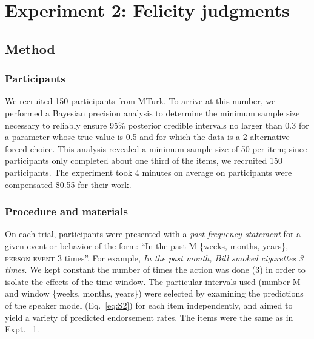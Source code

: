 \documentclass[10pt,letterpaper]{article}
\newcommand{\ndg}[1]{\textcolor{Green}{[ndg: #1]}}
\newcommand{\mht}[1]{\textcolor{DarkOrange}{[mht: #1]}}
\begin{document}



\section{Experiment 2: Felicity judgments}

\subsection{Method}

\subsubsection{Participants}

We recruited 150 participants from MTurk.
To arrive at this number, we performed a Bayesian precision analysis to determine the minimum sample size necessary to reliably ensure 95\% posterior credible intervals no larger than 0.3 for a parameter whose true value is 0.5 and for which the data is a 2 alternative forced choice. This analysis revealed a minimum sample size of 50 per item; since participants only completed about one third of the items, we recruited 150 participants.
The experiment took 4 minutes on average on participants were compensated \$0.55 for their work.

\subsubsection{Procedure and materials}

On each trial, participants were presented with a \emph{past frequency statement} for a given event or behavior of the form: ``In the past M \{weeks, months, years\}, \textsc{person} \textsc{event} 3 times''.
For example, \emph{In the past month, Bill smoked cigarettes 3 times}.
We kept constant the number of times the action was done (3) in order to isolate the effects of the time window. 
The particular intervals used (number M and window \{weeks, months, years\}) were selected by examining the predictions of the speaker model (Eq.~\ref{eq:S2}) for each item independently, and aimed to yield a variety of predicted endorsement rates.
The items were the same as in Expt. ~1.
\end{document}
